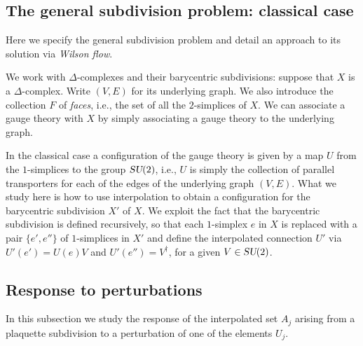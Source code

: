 \documentclass[12pt]{amsart}
\def\su2{\textsl{SU}(2)}
\theoremstyle{definition}
\theoremstyle{remark}
\numberwithin{equation}{section}
\begin{document}
\subsection{The general subdivision problem: classical case}
Here we specify the general subdivision problem and detail an approach to its solution via \emph{Wilson flow}. 

We work with $\Delta$-complexes and their barycentric subdivisions: suppose that $X$ is a $\Delta$-complex. Write $(V,E)$ for its underlying graph. We also introduce the collection $F$ of \emph{faces}, i.e., the set of all the $2$-simplices of $X$. We can associate a gauge theory with $X$ by simply associating a gauge theory to the underlying graph. 

In the classical case a configuration of the gauge theory is given by a map $U$ from the $1$-simplices to the group $\su2$, i.e., $U$ is simply the collection of parallel transporters for each of the edges of the underlying graph $(V,E)$. What we study here is how to use interpolation to obtain a configuration for the barycentric subdivision $X'$ of $X$. We exploit the fact that the barycentric subdivision is defined recursively, so that each $1$-simplex $e$ in $X$ is replaced with a pair $\{e', e''\}$ of $1$-simplices in $X'$  and define the interpolated connection $U'$ via $U'(e') = U(e)V$ and $U'(e'') = V^\dag$, for a given $V\in \su2$.

\subsection{Response to perturbations}
In this subsection we study the response of the interpolated set $A_j$ arising from a plaquette subdivision to a perturbation of one of the elements $U_j$.
\end{document}
